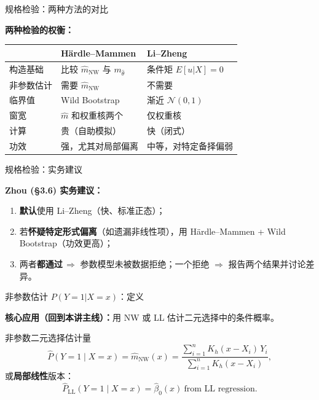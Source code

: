 \documentclass[aspectratio=169, 10pt]{beamer}
\renewcommand{\arraystretch}{1.05}
\begin{document}
\begin{frame}{规格检验：两种方法的对比}

  \begin{highlightbox}
    \textbf{两种检验的权衡：}
  \end{highlightbox}

  \centering\small
  \renewcommand{\arraystretch}{1.25}
  \begin{tabular}{@{}p{2.8cm}p{5.5cm}p{5.5cm}@{}}
    \toprule
     & \textbf{Härdle--Mammen} & \textbf{Li--Zheng} \\
    \midrule
    构造基础 & 比较 $\hat m_{\text{NW}}$ 与 $m_{\hat\theta}$ & 条件矩 $E[u|X]=0$ \\
    非参数估计 & 需要 $\hat m_{\text{NW}}$ & 不需要 \\
    临界值 & Wild Bootstrap & 渐近 $\mathcal{N}(0,1)$ \\
    窗宽 & $\hat m$ 和权重核两个 & 仅权重核 \\
    计算 & 贵（自助模拟） & 快（闭式） \\
    功效 & 强，尤其对局部偏离 & 中等，对特定备择偏弱 \\
    \bottomrule
  \end{tabular}

\end{frame}


\begin{frame}{规格检验：实务建议}

  \begin{keybox}
    \textbf{Zhou (§3.6) 实务建议：}
    \begin{enumerate}
      \item \textbf{默认}使用 Li--Zheng（快、标准正态）；
      \item 若\textbf{怀疑特定形式偏离}（如遗漏非线性项），用 Härdle--Mammen + Wild Bootstrap（功效更高）；
      \item 两者\textbf{都通过}\,$\Rightarrow$ 参数模型未被数据拒绝；一个拒绝 $\Rightarrow$ 报告两个结果并讨论差异。
    \end{enumerate}
  \end{keybox}

\end{frame}


\begin{frame}{非参数估计 $P(Y=1|X=x)$：定义}

  \textbf{核心应用（回到本讲主线）：}用 NW 或 LL 估计二元选择中的条件概率。

  \begin{definitionbox}{非参数二元选择估计量}
    \[
      \hat P(Y=1\mid X=x) = \hat m_{\text{NW}}(x) = \frac{\sum_{i=1}^n K_h(x-X_i)\, Y_i}{\sum_{i=1}^n K_h(x-X_i)},
    \]
    或\textbf{局部线性}版本：
    \[
      \hat P_{\text{LL}}(Y=1\mid X=x) = \hat\beta_0(x)\ \text{from LL regression}.
    \]
  \end{definitionbox}

\end{frame}
\end{document}
